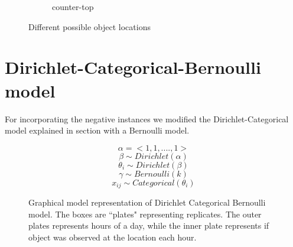 \begin{figure}
\begin{subfigure}[b]{0.3\textwidth}
        \caption{counter-top}
        \label{fig:counter-top}
    \end{subfigure}
    \caption{Different possible object locations}\label{fig:alllocations}
\end{figure}

\FloatBarrier
\section{Dirichlet-Categorical-Bernoulli model}

For incorporating the negative instances we modified the Dirichlet-Categorical model explained in section  with a Bernoulli model.


\noindent
\begin{figure}[htp]
\begin{minipage}{0.3\textwidth}
\centering


\end{minipage}%
\begin{minipage}{0.7\textwidth}

\begin{equation*}
	\alpha = <1, 1, .... , 1 > 
\end{equation*}
\begin{equation*}
	\beta \sim Dirichlet(\alpha)
\end{equation*}
\begin{equation*}
	\theta_i  \sim Dirichlet(\beta)
\end{equation*}
\begin{equation*}
	\gamma  \sim Bernoulli(k)
\end{equation*}
\begin{equation*}
	x_{ij} \sim Categorical(\theta_i)
\end{equation*}
\end{minipage}

\caption[Dirichlet Categorical Bernoulli graphical model]{Graphical model representation of Dirichlet Categorical Bernoulli model. The boxes are ``plates" representing replicates. The outer plates represents hours of a day, while the inner plate represents if object was observed at the location each hour.}
\label{dcbm}
\end{figure}




